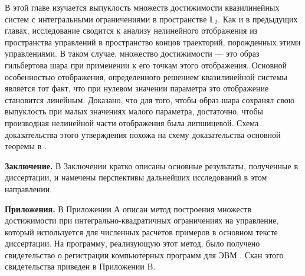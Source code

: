 \documentclass[../main.tex]{subfiles}
\begin{document}
В этой главе изучается выпуклость множеств достижимости квазилинейных систем с интегральными ограничениями в пространстве $\mathbb{L}_2$. 
Как и в предыдущих главах, исследование сводится к анализу нелинейного отображения из пространства управлений в пространство концов траекторий, порожденных этими управлениями.
В таком случае, множество достижимости --- это образ гильбертова шара при применении к его точкам этого отображения. 
Основной особенностью отображения, определенного решением квазилинейной системы является тот факт, что при нулевом значении параметра это отображение становится линейным.
Доказано, что для того, чтобы образ шара сохранял свою выпуклость при малых значениях малого параметра, достаточно, чтобы производная нелинейной части отображения была липшицевой. 
Схема доказательства этого утверждения похожа на схему доказательства основной теоремы в \cite{Polyak2001}.

\textbf{Заключение. }
В Заключении кратко описаны основные результаты, полученные в диссертации, и намечены перспективы дальнейших исследований в этом направлении.

\textbf{Приложения. }
В Приложении А описан метод построения множеств достижимости при интегрально-квадратичных ограничениях на управление, который используется для численных расчетов примеров в основном тексте диссертации. 
На программу, реализующую этот метод, было получено свидетельство о регистрации компьютерных программ для ЭВМ \cite{Patent}. 
Скан этого свидетельства приведен в Приложении B.
\pagebreak
\end{document}
